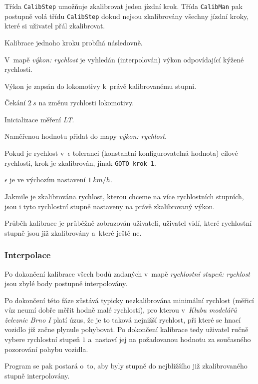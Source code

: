 Třída \texttt{CalibStep} umožňuje zkalibrovat jeden jízdní krok. Třída
\texttt{CalibMan} pak postupně volá třídu \texttt{CalibStep} dokud nejsou
zkalibrovány všechny jízdní kroky, které si uživatel přál zkalibrovat.

Kalibrace jednoho kroku probíhá následovně.

\begin{compactenum}
\item V~mapě \textit{výkon: rychlost} je vyhledán (interpolován) výkon odpovídající
      kýžené rychlosti.
\item Výkon je zapsán do lokomotivy k~právě kalibrovanému stupni.
\item Čekání $2\ s$ na změnu rychlosti lokomotivy.
\item Inicializace měření \textit{LT}.
\item Naměřenou hodnotu přidat do mapy \textit{výkon: rychlost}.
\item Pokud je rychlost v~$\epsilon$ toleranci (konstantní konfigurovatelná hodnota)
      cílové rychlosti, krok je zkalibrován, jinak \texttt{GOTO krok 1}.
\end{compactenum}

$\epsilon$ je ve výchozím nastavení $1\ km/h$.

Jakmile je zkalibrována rychlost, kterou chceme na více rychlostních stupních,
jsou i tyto rychlostní stupně nastaveny na právě zkalibrovaný výkon.

Průběh kalibrace je průběžně zobrazován uživateli, uživatel vidí, které rychlostní
stupně jsou již zkalibrovány a~které ještě ne.

\subsubsection{Interpolace}

Po dokončení kalibrace všech bodů zadaných v~mapě \textit{rychlostní stupeň:
rychlost} jsou zbylé body postupně interpolovány.

Po dokončení této fáze zůstává typicky nezkalibrována minimální rychlost
(měřicí vůz neumí dobře měřit hodně malé rychlosti), pro kterou v~\textit{Klubu
modelářů železnic Brno I} platí úzus, že je to taková nejnižší rychlost, při
které se hnací vozidlo již začne plynule pohybovat.  Po dokončení kalibrace
tedy uživatel ručně vybere rychlostní stupeň $1$ a~nastaví jej na požadovanou
hodnotu za současného pozorování pohybu vozidla.

Program se pak postará o~to, aby byly stupně do nejbližšího již zkalibrovaného
stupně interpolovány.

